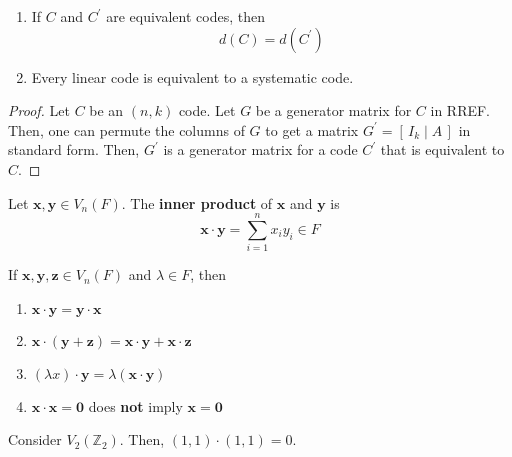 \begin{thmbox}
    \begin{theorem}
        \begin{enumerate}[label=(\arabic*)]
            \item If $ C $ and $ C^{\prime} $ are equivalent codes, then
                  \[ d(C)=d(C^{\prime}) \]
            \item Every linear code is equivalent to a systematic code.
        \end{enumerate}
    \end{theorem} \end{thmbox}

\begin{proof}
    Let $ C $ be an $ (n,k) $ code. Let $ G $ be a generator matrix for $ C $
    in RREF\@. Then, one can permute the columns of $ G $ to get a matrix
    $ G^{\prime}=\left[ \,I_k\mid A\, \right] $ in standard form. Then,
    $ G^{\prime} $ is a generator matrix for a code $ C^{\prime} $ that is
    equivalent to $ C $.
\end{proof}

\begin{defbox}
    \begin{definition}
        Let $ \bm{x},\bm{y}\in V_n(F) $. The \textbf{inner product}
        of $ \bm{x} $ and $ \bm{y} $ is
        \[ \bm{x}\cdot \bm{y}=\sum\limits_{i=1}^{n} x_i y_i\in F \]
    \end{definition} \end{defbox}

\begin{thmbox}
    \begin{theorem}
        If $ \bm{x},\bm{y},\bm{z}\in V_n(F) $ and $ \lambda\in F $, then
        \begin{enumerate}[label=(\arabic*)]
            \item $ \bm{x}\cdot \bm{y}=\bm{y}\cdot \bm{x} $
            \item $ \bm{x}\cdot (\bm{y}+\bm{z})=\bm{x}\cdot \bm{y}+\bm{x}\cdot \bm{z} $
            \item $ (\lambda x)\cdot \bm{y}=\lambda(\bm{x}\cdot \bm{y}) $
            \item $ \bm{x}\cdot \bm{x}=\bm{0}$ does \textbf{not} imply $ \bm{x}=\bm{0} $
        \end{enumerate}
    \end{theorem} \end{thmbox}

\begin{exbox}
    \begin{example}
        Consider $ V_2(\mathbb{Z}_2) $. Then, $ (1,1)\cdot(1,1)=0 $.
    \end{example}
\end{exbox}

